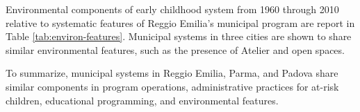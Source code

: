 Environmental components of early childhood system from 1960 through 2010 relative to systematic features of Reggio Emilia's municipal program are report in Table \ref{tab:environ-features}. Municipal systems in three cities are shown to share similar environmental features, such as the presence of Atelier and open spaces.   
				
				
To summarize, municipal systems in Reggio Emilia, Parma, and Padova share similar components in program operations, administrative practices for at-risk children, educational programming, and environmental features. 


